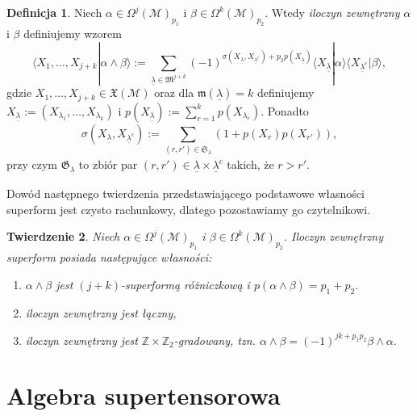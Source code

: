 \documentclass[11pt,a4paper]{report}
\newtheorem{theorem}{Twierdzenie}[section]
\theoremstyle{definition}
\newtheorem{definition}[theorem]{Definicja}
\begin{document}
\begin{definition}\label{iloczynsup}
	Niech $\alpha \in \Omega^j (\mathcal{M})_{p_1}\!$ i $\beta\in \Omega^k (\mathcal{M})_{p_2}$. Wtedy \textit{iloczyn zewnętrzny} $\alpha$ i $\beta$ definiujemy wzorem
	\begin{equation*}
		\langle X_1, \ldots, X_{j+k} | \alpha\wedge\beta\rangle := 
		\sum_{\underline \lambda\in \mathfrak M^{j+k}}(-1)^{\sigma(X_{\underline \lambda},X_{\underline \lambda^c})+p_2 p(X_{\underline \lambda})} \langle X_{\underline \lambda} | \alpha \rangle \langle X_{\underline \lambda^c}| \beta \rangle,
	\end{equation*}
	gdzie $X_1, \ldots, X_{j+k} \in \mathfrak{X}({\mathcal M})$ oraz dla $\mathfrak{m}(\underline \lambda) =k$ definiujemy $X_{\underline \lambda} := (X_{\lambda_1},\ldots,X_{\lambda_k})$ i $p(X_{\underline \lambda}) :=\sum_{r=1}^kp(X_{\lambda_r})$. Ponadto
	\begin{equation*}
		\sigma(X_{\underline \lambda},X_{\underline \lambda^c}) := \sum_{(r, r') \in \mathfrak S_{\underline{\lambda}}} (1+p(X_r)p(X_{r'})),
	\end{equation*}
	przy czym $\mathfrak{G}_{\underline{\lambda}}$ to zbiór par $(r,r') \in \underline \lambda \times \underline \lambda^c$ takich, że $r > r'.$
\end{definition}
		      			
Dowód następnego twierdzenia przedstawiającego podstawowe własności superform jest czysto rachunkowy, dlatego pozostawiamy go czytelnikowi.
		      			
\begin{theorem}
	Niech $\alpha \in \Omega^j (\mathcal{M})_{p_1}\!$ i $\beta\in \Omega^k (\mathcal{M})_{p_2}$. Iloczyn zewnętrzny superform posiada następujące własności:
	\begin{enumerate}[(1)]
		\item $\alpha\wedge \beta$ jest $(j+k)$-superformą różniczkową i $p(\alpha \wedge \beta)=p_1 + p_2$.
		\item iloczyn zewnętrzny jest łączny,
		\item iloczyn zewnętrzny jest $\mathbb{Z}\times \mathbb{Z}_2$-gradowany, tzn.  $\alpha\wedge\beta=(-1)^{jk+p_1 p_2}\beta\wedge\alpha.$
	\end{enumerate}
\end{theorem}
		      			
\section{Algebra supertensorowa}
		      			
\end{document}
